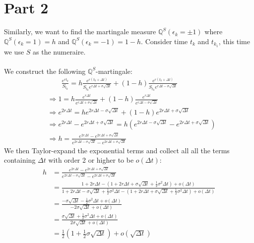 \documentclass[12pt, letterpaper]{article}
\begin{document}
\section*{Part 2}
Similarly, we want to find the martingale measure $\mathbb{Q}^S(\epsilon_k = \pm 1)$ where $\mathbb{Q}^S(\epsilon_k =1) = h$ and $\mathbb{Q}^S(\epsilon_k =-1) = 1-h$. Consider 
time $t_k$ and $t_{k_1}$, this time we use $S$ as the numeraire. \\ \\
We construct the following $\mathbb{Q}^S$-martingale:
\begin{align*}
  &\qquad \frac{e^{rt_k}}{S_{t_k}} = h\frac{e^{r(t_k+\Delta t)}}{S_{t_k}e^{r\Delta t + \sigma \sqrt{\Delta t}}} + (1-h)\frac{e^{r(t_k+\Delta t)}}{S_{t_k}e^{r\Delta t - \sigma \sqrt{\Delta t}}}\\
  &\Rightarrow  1 = h\frac{e^{r\Delta t}}{e^{r\Delta t + \sigma \sqrt{\Delta t}}} + (1-h) \frac{e^{r\Delta t}}{e^{r\Delta t - \sigma \sqrt{\Delta t}}} \\
  &\Rightarrow e^{2r\Delta t} = he^{2r\Delta t - \sigma \sqrt{\Delta t}} + (1-h)e^{2r\Delta t + \sigma \sqrt{\Delta t}}\\
  &\Rightarrow e^{2r\Delta t} - e^{2r\Delta t + \sigma \sqrt{\Delta t}} = h(e^{2r\Delta t - \sigma \sqrt{\Delta t}} - e^{2r\Delta t + \sigma \sqrt{\Delta t}}) \\
  &\Rightarrow h = \frac{e^{2r\Delta t} - e^{2r\Delta t + \sigma \sqrt{\Delta t}}}{e^{2r\Delta t - \sigma \sqrt{\Delta t}} - e^{2r\Delta t + \sigma \sqrt{\Delta t}}}
\end{align*}
We then Taylor-expand the exponential terms and collect all all the terms containing $\Delta t$ with order 2 or higher to be $o(\Delta t)$:
\begin{align*}
  h &= \frac{e^{2r\Delta t} - e^{2r\Delta t + \sigma \sqrt{\Delta t}}}{e^{2r\Delta t - \sigma \sqrt{\Delta t}} - e^{2r\Delta t + \sigma \sqrt{\Delta t}}} \\
    &= \frac{1+2r\Delta t - (1+2r\Delta t+\sigma \sqrt{\Delta t} + \frac{1}{2} \sigma^2\Delta t) + o(\Delta t)}
        {1+2r\Delta t - \sigma \sqrt{\Delta t} + \frac{1}{2} \sigma^2\Delta t - (1+2r\Delta t+\sigma \sqrt{\Delta t} + \frac{1}{2} \sigma^2\Delta t) + o(\Delta t)}\\
    &= \frac{-\sigma \sqrt{\Delta t} - \frac{1}{2} \sigma^2\Delta t+ o(\Delta t)}{-2\sigma \sqrt{\Delta t} +o(\Delta t)}\\
    &= \frac{\sigma \sqrt{\Delta t} + \frac{1}{2} \sigma^2\Delta t+ o(\Delta t)}{2\sigma \sqrt{\Delta t} +o(\Delta t)}\\
    &= \frac{1}{2}(1+\frac{1}{2}\sigma \sqrt{\Delta t}) + o(\sqrt{\Delta t})
\end{align*}
\end{document}
